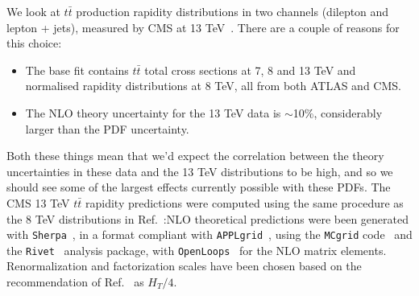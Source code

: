 We look at $t\bar{t}$ production rapidity distributions in two channels (dilepton and lepton + jets), measured by CMS at 13 TeV~\cite{Sirunyan:2018ucr,Sirunyan:2018wem}. There are a couple of reasons for this choice:
\begin{itemize}
\item The base fit contains $t\bar{t}$ total cross sections at 7, 8 and 13 TeV and normalised rapidity distributions at 8 TeV, all from both ATLAS and CMS.
\item The NLO theory uncertainty for the 13 TeV data is $\sim$10\%, considerably larger than the PDF uncertainty.
\end{itemize}
Both these things mean that we'd expect the correlation between the theory uncertainties in these data and the 13 TeV distributions to be high, and so we should see some of the largest effects currently possible with these PDFs. The CMS 13 TeV $t\bar{t}$ rapidity predictions were computed using the same procedure as the 8 TeV distributions in Ref.~\cite{Ball:2017nwa}:NLO theoretical predictions were been generated with {\tt Sherpa}~\cite{Gleisberg:2008ta}, in a format compliant with {\tt APPLgrid}~\cite{Carli:2010rw}, using the {\tt MCgrid} 
code~\cite{DelDebbio:2013kxa} and the {\tt Rivet}~\cite{Buckley:2010ar} analysis package, with {\tt OpenLoops}~\cite{Cascioli:2011va} for the NLO 
matrix elements. Renormalization and factorization scales have been chosen based on the recommendation of 
Ref.~\cite{Czakon:2016dgf} as $H_T/4$.

